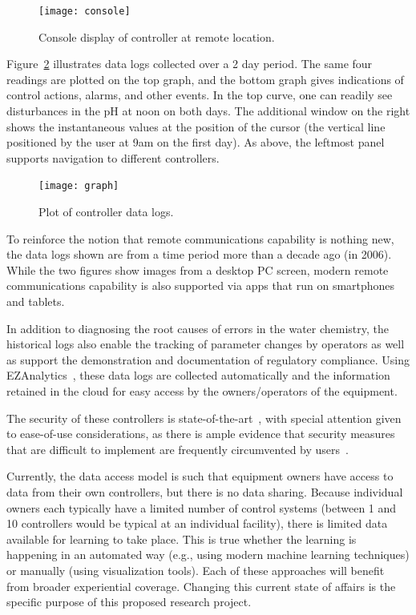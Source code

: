 \begin{figure}[t]
 \center
\texttt{[image: console]}
    \caption{Console display of controller at remote location.}
    \label{console}
\end{figure}

Figure~\ref{graph} illustrates data logs collected over a 2 day period.
The same four readings are plotted on the top graph, and the bottom
graph gives indications of control actions, alarms, and other events.
In the top curve, one can readily see disturbances in the pH at noon
on both days.
The additional window on the right shows the instantaneous values
at the position of the cursor (the vertical line positioned
by the user at 9am on the first day).
As above, the leftmost panel supports navigation to different
controllers.

\begin{figure}[t]
 \center
\texttt{[image: graph]}
    \caption{Plot of controller data logs.}
    \label{graph}
\end{figure}

To reinforce the notion that remote communications capability is
nothing new, the data logs shown are from a time period more than a
decade ago (in 2006).
While the two figures show images from a desktop PC screen, modern
remote communications capability is also supported via apps that
run on smartphones and tablets.

In addition to diagnosing the root causes of errors in the water
chemistry, the historical logs also enable the tracking of
parameter changes by operators as well as support the demonstration
and documentation of regulatory compliance.
Using EZAnalytics\texttrademark{}~\cite{ccgss17}, these data logs
are collected automatically and the information retained in the
cloud for easy access by the owners/operators of the equipment.

The security of these controllers is
state-of-the-art~\cite{ccgss16,ccgss17b}, with special attention given
to ease-of-use considerations, as there is ample evidence that
security measures that are difficult to implement are frequently
circumvented by users~\cite{gefen2000relative,hertzum2004usable,schneier16}.

Currently, the data access model is such that equipment owners have
access to data from their own controllers, but there is no data sharing.
Because individual owners each typically have a limited number of
control systems (between 1 and 10 controllers would be typical at an
individual facility), there is limited data available for
learning to take place.  This is true whether the learning is
happening in an automated way (e.g., using modern
machine learning techniques) or manually (using visualization tools).
Each of these approaches will benefit from broader experiential coverage.
Changing this current state of affairs is the specific purpose of this
proposed research project.

